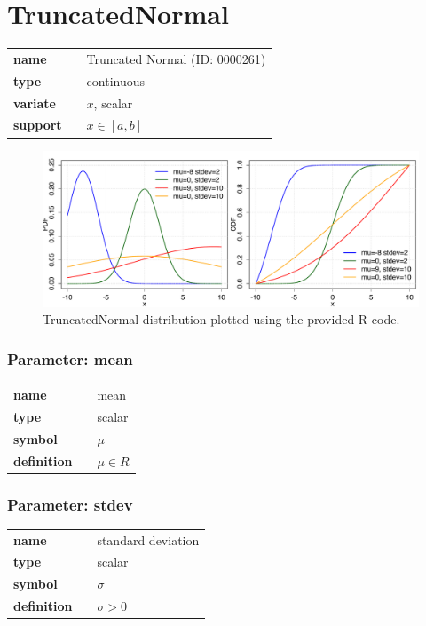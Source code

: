 \section*{TruncatedNormal} 

  \bigskip 

\begin{tabular}{p{2cm}cl}
\textbf{name} & & Truncated Normal (ID: 0000261)\\ 
 
\textbf{type} & & continuous \\ 

\textbf{variate} & & $x$, scalar \\ 

\textbf{support} & & $x \in [a,b]$
\end{tabular}

\begin{figure}[ht!]
\centering
  \includegraphics[width=140mm]{pics/TruncatedNormal.pdf}
 \caption{TruncatedNormal distribution plotted using the provided R code.}
 \label{fig:TruncatedNormal}
\end{figure}

\subsubsection*{Parameter: mean}

\noindent\begin{tabular}{p{2cm}cl}
\textbf{name} & & mean \\
\textbf{type} & & scalar \\
\textbf{symbol} & & $\mu$  \\
\textbf{definition} & & $\mu \in R$
\end{tabular}
\subsubsection*{Parameter: stdev}

\noindent\begin{tabular}{p{2cm}cl}
\textbf{name} & & standard deviation \\
\textbf{type} & & scalar \\
\textbf{symbol} & & $\sigma$  \\
\textbf{definition} & & $\sigma > 0$
\end{tabular}
